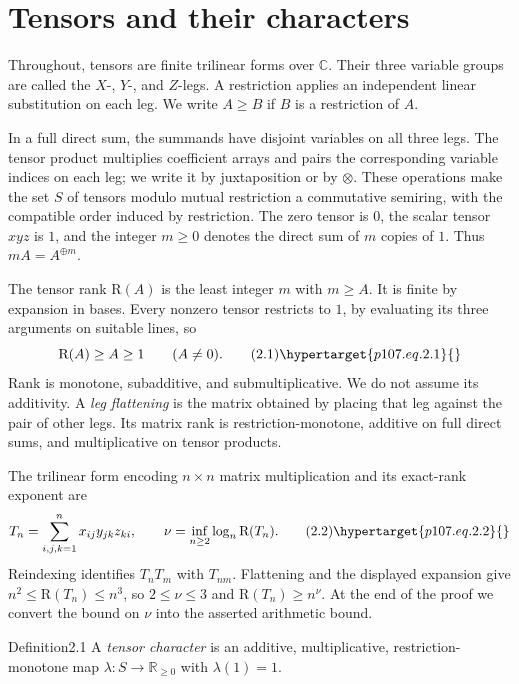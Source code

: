 \section{Tensors and their characters}\hypertarget{p107.sec.2}{}
Throughout, tensors are finite trilinear forms over $\mathbb C$. Their three variable groups are called the $X$-, $Y$-, and $Z$-legs. A restriction applies an independent linear substitution on each leg. We write $A\ge B$ if $B$ is a restriction of $A$.

In a full direct sum, the summands have disjoint variables on all three legs. The tensor product multiplies coefficient arrays and pairs the corresponding variable indices on each leg; we write it by juxtaposition or by $\otimes$. These operations make the set $S$ of tensors modulo mutual restriction a commutative semiring, with the compatible order induced by restriction. The zero tensor is $0$, the scalar tensor $xyz$ is $1$, and the integer $m\ge0$ denotes the direct sum of $m$ copies of $1$. Thus $mA=A^{\oplus m}$.

The tensor rank $\mathrm R(A)$ is the least integer $m$ with $m\ge A$. It is finite by expansion in bases. Every nonzero tensor restricts to $1$, by evaluating its three arguments on suitable lines, so
\begin{equation}\mathrm R(A)\ge A\ge1\qquad(A\ne0).\tag{2.1}\hypertarget{p107.eq.2.1}{}\end{equation}
Rank is monotone, subadditive, and submultiplicative. We do not assume its additivity. A \emph{leg flattening} is the matrix obtained by placing that leg against the pair of other legs. Its matrix rank is restriction-monotone, additive on full direct sums, and multiplicative on tensor products.

The trilinear form encoding $n\times n$ matrix multiplication and its exact-rank exponent are
\begin{equation}T_n=\sum_{i,j,k=1}^n x_{ij}y_{jk}z_{ki},\qquad\nu=\inf_{n\ge2}\log_n\mathrm R(T_n).\tag{2.2}\hypertarget{p107.eq.2.2}{}\end{equation}
Reindexing identifies $T_nT_m$ with $T_{nm}$. Flattening and the displayed expansion give $n^2\le\mathrm R(T_n)\le n^3$, so $2\le\nu\le3$ and $\mathrm R(T_n)\ge n^\nu$. At the end of the proof we convert the bound on $\nu$ into the asserted arithmetic bound.

\begin{result}{Definition}{2.1}{}
A \emph{tensor character} is an additive, multiplicative, restriction-monotone map $\lambda:S\to\mathbb R_{\ge0}$ with $\lambda(1)=1$.
\end{result}

